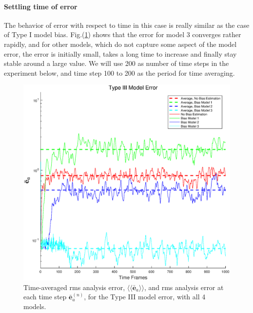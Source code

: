 \documentclass[twocolumn]{article}
\begin{document}
\paragraph{Settling time of error}
The behavior of error with respect to time in this case is really similar as the case of Type I model bias. Fig.(\ref{ErrVsTimeM3.1}) shows that the error for model 3 converges rather rapidly, and for other models, which do not capture some aspect of the model error, the error is initially small, takes a long time to increase and finally stay stable around a large value. We will use 200 as number of time steps in the experiment below, and time step 100 to 200 as the period for time averaging.
\begin{figure} 
\centering
\includegraphics[scale=0.3]{Figures/ErrVsTimeM3_1}
\caption{Time-averaged rms analysis error, $\langle\langle\bar{\pmb{e}}_a\rangle\rangle$, and rms analysis error at each time step $\bar{\pmb{e}}_a^{(n)}$, for the Type III model error, with all 4 models.}
\label{ErrVsTimeM3.1}
\end{figure}
\end{document}
